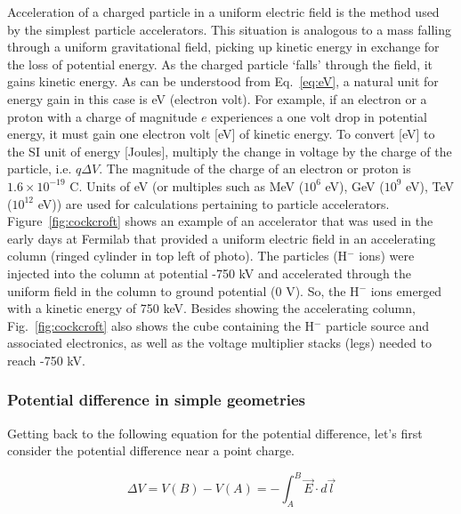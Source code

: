 \documentclass[12pt]{article}
\begin{document}
\begin{flushleft}
Acceleration of a charged particle in a uniform electric field is the method used by the simplest particle accelerators.  This situation is analogous to a mass falling through a uniform gravitational field, picking up kinetic energy in exchange for the loss of potential energy.  As the charged particle `falls' through the field, it gains kinetic energy.  As can be understood from Eq.~\ref{eq:eV}, a natural unit for energy gain in this case is eV (electron volt).  For example, if an electron or a proton with a charge of magnitude $e$ experiences a one volt drop in potential energy, it must gain one electron volt [eV] of kinetic energy.  To convert [eV] to the SI unit of energy [Joules], multiply the change in voltage by the charge of the particle, i.e. $q\Delta V$.  The magnitude of the charge of an electron or proton is $1.6 \times 10^{-19}$ C.  Units of eV (or multiples such as MeV ($10^{6}$ eV), GeV  ($10^{9}$ eV), TeV  ($10^{12}$ eV)) are used for calculations pertaining to particle accelerators.  Figure~\ref{fig:cockcroft} shows an example of an accelerator that was used in the early days at Fermilab that provided a uniform electric field in an accelerating column (ringed cylinder in top left of photo).  The particles (H$^{-}$ ions) were injected into the column at potential -750 kV and accelerated through the uniform field in the column to ground potential (0 V).  So, the H$^{-}$ ions emerged with a kinetic energy of 750 keV.  Besides showing the accelerating column, Fig.~\ref{fig:cockcroft} also shows the cube containing the H$^{-}$ particle source and associated electronics, as well as the voltage multiplier stacks (legs) needed to reach -750 kV.

\subsubsection*{\bf Potential difference in simple geometries}

Getting back to the following equation for the potential difference, let's first consider the potential difference near a point charge.

\begin{equation}
\Delta V = V(B) - V(A) = - \int_{A}^{B} \vec{E} \cdot  d\vec{l} 
\label{eq:potwlimits}
\end{equation}


\end{flushleft}
\end{document}
